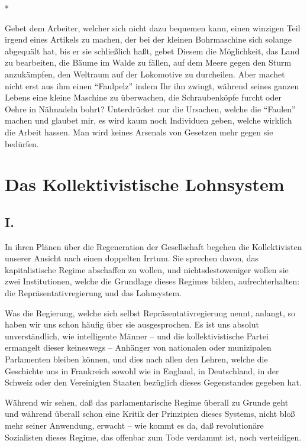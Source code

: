 \documentclass{scrbook}
\begin{document}
\begin{center}*\end{center}

Gebet dem Arbeiter, welcher sich nicht dazu bequemen kann, einen winzigen Teil irgend eines Artikels zu machen, der bei der kleinen Bohrmaschine sich solange abgequält hat, bis er sie schließlich haßt, gebet Diesem die Möglichkeit, das Land zu bearbeiten, die Bäume im Walde zu fällen, auf dem Meere gegen den Sturm anzukämpfen, den Weltraum auf der Lokomotive zu durcheilen. Aber machet nicht erst aus ihm einen ``Faulpelz'' indem Ihr ihn zwingt, während seines ganzen Lebens eine kleine Maschine zu überwachen, die Schraubenköpfe furcht oder Oehre in Nähnadeln bohrt?
Unterdrücket nur die Ursachen, welche die ``Faulen'' machen und glaubet mir, es wird kaum noch Individuen geben, welche wirklich die Arbeit hassen. Man wird keines Arsenals von Gesetzen mehr gegen sie bedürfen.

\chapter{Das Kollektivistische Lohnsystem}
\section*{I.}

In ihren Plänen über die Regeneration der Gesellschaft begehen die Kollektivisten unserer Ansicht nach einen doppelten Irrtum. Sie sprechen davon, das kapitalistische Regime abschaffen zu wollen, und nichtsdestoweniger wollen sie zwei Institutionen, welche die Grundlage dieses Regimes bilden, aufrechterhalten: die Repräsentativregierung und das Lohnsystem.

Was die Regierung, welche sich selbst Repräsentativregierung nennt, anlangt, so haben wir uns schon häufig über sie ausgesprochen. Es ist uns absolut unverständlich, wie intelligente Männer – und die kollektivistische Partei ermangelt dieser keineswegs – Anhänger von nationalen oder munizipalen Parlamenten bleiben können, und dies nach allen den Lehren, welche die Geschichte uns in Frankreich sowohl wie in England, in Deutschland, in der Schweiz oder den Vereinigten Staaten bezüglich dieses Gegenstandes gegeben hat.

Während wir sehen, daß das parlamentarische Regime überall zu Grunde geht und während überall schon eine Kritik der Prinzipien dieses Systems, nicht bloß mehr seiner Anwendung, erwacht – wie kommt es da, daß revolutionäre Sozialisten dieses Regime, das offenbar zum Tode verdammt ist, noch verteidigen.
\end{document}
